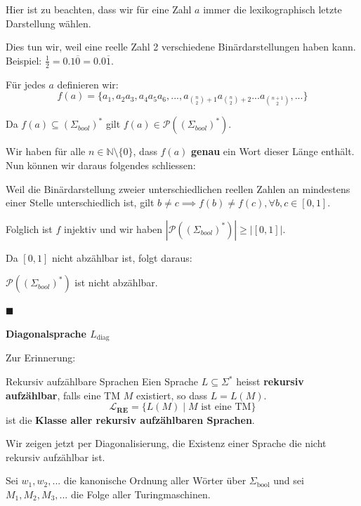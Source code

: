 \documentclass[a4paper, 11pt]{article}
\def\N{\mathbb{N}}
\begin{document}
                Hier ist zu beachten, dass wir für eine Zahl $a$ immer die lexikographisch letzte Darstellung wählen.
            
            Dies tun wir, weil eine reelle Zahl 2 verschiedene Binärdarstellungen haben kann. Beispiel: $\frac{1}{2} = 0.1\overline{0} = 0.0\overline{1}$.
                
                Für jedes $a$ definieren wir:
                $$f(a) = \{a_1, a_2a_3, a_4a_5a_6, ..., a_{\binom{n}{2}+1}a_{\binom{n}{2}+2}...a_{\binom{n+1}{2}} , ...\}$$
            
                Da $f(a) \subseteq (\Sigma_{bool})^*$ gilt $f(a) \in \mathcal{P}((\Sigma_{bool})^*)$.
            
                Wir haben für alle $n \in \N \setminus\{0\}$, dass $f(a)$ \textbf{genau} ein Wort dieser Länge enthält. Nun können wir daraus folgendes schliessen:
            
                Weil die Binärdarstellung zweier unterschiedlichen reellen Zahlen an mindestens einer Stelle unterschiedlich ist, gilt $b \neq c \implies f(b) \neq f(c), \forall b,c \in [0, 1]$. 
            
                Folglich ist $f$ injektiv und wir haben $|\mathcal{P}((\Sigma_{bool})^*)| \geq |[0, 1]|$.
            
                Da $[0,1]$ nicht abzählbar ist, folgt daraus:
            
                $\mathcal{P}((\Sigma_{bool})^*)$ ist nicht abzählbar.
                
                \hspace*{0pt}\hfill$\blacksquare$
        
        
        
            \textbf{Diagonalsprache $L_{\text{diag}}$ }

            Zur Erinnerung:
            \begin{mainbox}{Rekursiv aufzählbare Sprachen}
                Eien Sprache $L \subseteq \Sigma^*$ heisst \textbf{rekursiv aufzählbar}, falls eine TM $M$ existiert, so dass $L = L(M)$.
                $$\mathbf{\mathcal{L}_{\textbf{RE}}} = \{L(M) \mid M \text{ ist eine TM}\}$$
                ist die \textbf{Klasse aller rekursiv aufzählbaren Sprachen}.
            \end{mainbox}
            Wir zeigen jetzt per Diagonalisierung, die Existenz einer Sprache die nicht rekursiv aufzählbar ist.
        
        
            Sei $w_1, w_2,...$ die kanonische Ordnung aller Wörter über $\Sigma_{\text{bool}}$ und sei $M_1, M_2, M_3,...$ die Folge aller Turingmaschinen.
            
\end{document}
